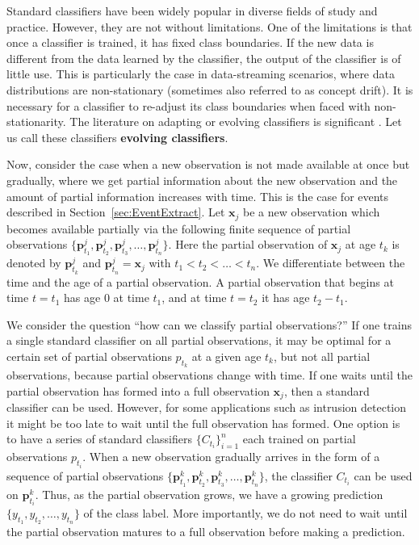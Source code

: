 \documentclass[a4paper,11pt]{article}
\begin{document}
Standard classifiers have been widely popular in diverse fields of study and practice. However, they are not without limitations. One of the limitations is that once a classifier is trained, it has fixed class boundaries. If the new data is different from the data learned by the classifier, the output of the classifier is of little use. This is particularly the case in data-streaming scenarios, where data distributions are non-stationary (sometimes also referred to as concept drift). It is necessary for a classifier to re-adjust its class boundaries when faced with non-stationarity. The literature on adapting or evolving classifiers is significant \cite{duchi2011adaptive, dabbagh2005online, frey1991letter, giacinto1997adaptive, nishida2005ace,alippi2008just, alippi2008just2}. Let us call these classifiers \textbf{evolving classifiers}.

Now, consider the case when a new observation is not made available at once but gradually, where we get partial information about the new observation and the amount of partial information increases with time. This is the case for events described in Section~\ref{sec:EventExtract}. Let $\bm{x}_j$ be a new observation which becomes available partially via the following finite sequence of partial observations $\{\bm{p}^j_{t_1},\bm{p}^j_{t_2}, \bm{p}^j_{t_3}, \dots, \bm{p}^j_{t_n}\}$. Here the partial observation of $\bm{x}_j$ at age $t_k$ is denoted by $\bm{p}^j_{t_k}$ and $\bm{p}^j_{t_n} = \bm{x}_j$ with $t_1 < t_2 < \dots < t_n$. We differentiate between the time and the age of a partial observation. A partial observation that begins at time $t =t_1$ has age $0$ at time $t_1$, and at time $t = t_2$ it has age $t_2 - t_1$.

We consider the question ``how can we classify partial observations?'' If one trains a single standard classifier on all partial observations, it may be optimal for a certain set of partial observations $p_{t_k}$ at a given age $t_k$, but not all partial observations, because partial observations change with time. If one waits until the partial observation has formed into a full observation $\bm{x}_j$, then a standard classifier can be used. However, for some applications such as intrusion detection it might be too late to wait until the full observation has formed. One option is to have a series of standard classifiers $\{C_{t_i}\}_{i=1}^n$ each trained on partial observations $p_{t_i}$. When a new observation gradually arrives in the form of a sequence of partial observations $\{\bm{p}^k_{t_1},\bm{p}^k_{t_2}, \bm{p}^k_{t_3}, \dots, \bm{p}^k_{t_n}\}$, the classifier $C_{t_i}$ can be used on $\bm{p}^k_{t_i}$. Thus, as the partial observation grows, we have a growing prediction $\{y_{t_1}, y_{t_2}, \dots, y_{t_n}\}$ of the class label. More importantly, we do not need to wait until the partial observation matures to a full observation before making a prediction.
\end{document}
